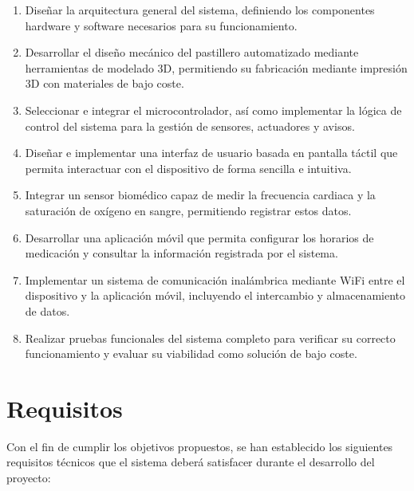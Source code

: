\begin{enumerate}
    \item Diseñar la arquitectura general del sistema, definiendo los componentes hardware y software necesarios para su funcionamiento.

    \item Desarrollar el diseño mecánico del pastillero automatizado mediante herramientas de modelado 3D, permitiendo su fabricación mediante impresión 3D con materiales de bajo coste.

    \item Seleccionar e integrar el microcontrolador, así como implementar la lógica de control del sistema para la gestión de sensores, actuadores y avisos.

    \item Diseñar e implementar una interfaz de usuario basada en pantalla táctil que permita interactuar con el dispositivo de forma sencilla e intuitiva.

    \item Integrar un sensor biomédico capaz de medir la frecuencia cardiaca y la saturación de oxígeno en sangre, permitiendo registrar estos datos.

    \item Desarrollar una aplicación móvil que permita configurar los horarios de medicación y consultar la información registrada por el sistema.

    \item Implementar un sistema de comunicación inalámbrica mediante WiFi entre el dispositivo y la aplicación móvil, incluyendo el intercambio y almacenamiento de datos.

    \item Realizar pruebas funcionales del sistema completo para verificar su correcto funcionamiento y evaluar su viabilidad como solución de bajo coste.
\end{enumerate}

\section{Requisitos}
\label{sec:requisitos}

Con el fin de cumplir los objetivos propuestos, se han establecido los siguientes requisitos técnicos que el sistema deberá satisfacer durante el desarrollo del proyecto:

